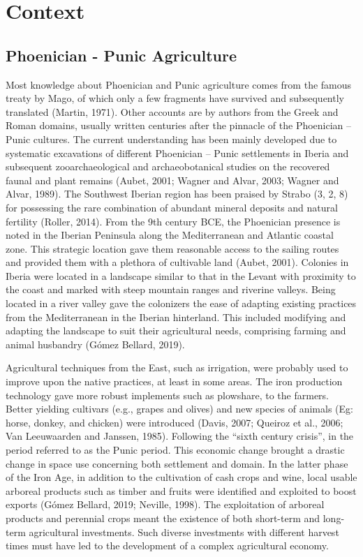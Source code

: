 \documentclass[review]{elsarticle} %
\begin{document}
\hypertarget{context}{%
\section{Context}\label{context}}

\hypertarget{phoenician---punic-agriculture}{%
\subsection{Phoenician - Punic Agriculture}\label{phoenician---punic-agriculture}}

Most knowledge about Phoenician and Punic agriculture comes from the famous treaty by Mago, of which only a few fragments have survived and subsequently translated (Martin, 1971). Other accounts are by authors from the Greek and Roman domains, usually written centuries after the pinnacle of the Phoenician -- Punic cultures. The current understanding has been mainly developed due to systematic excavations of different Phoenician -- Punic settlements in Iberia and subsequent zooarchaeological and archaeobotanical studies on the recovered faunal and plant remains (Aubet, 2001; Wagner and Alvar, 2003; Wagner and Alvar, 1989).
The Southwest Iberian region has been praised by Strabo (3, 2, 8) for possessing the rare combination of abundant mineral deposits and natural fertility (Roller, 2014). From the 9th century BCE, the Phoenician presence is noted in the Iberian Peninsula along the Mediterranean and Atlantic coastal zone. This strategic location gave them reasonable access to the sailing routes and provided them with a plethora of cultivable land (Aubet, 2001). Colonies in Iberia were located in a landscape similar to that in the Levant with proximity to the coast and marked with steep mountain ranges and riverine valleys. Being located in a river valley gave the colonizers the ease of adapting existing practices from the Mediterranean in the Iberian hinterland. This included modifying and adapting the landscape to suit their agricultural needs, comprising farming and animal husbandry (Gómez Bellard, 2019).

Agricultural techniques from the East, such as irrigation, were probably used to improve upon the native practices, at least in some areas. The iron production technology gave more robust implements such as plowshare, to the farmers. Better yielding cultivars (e.g., grapes and olives) and new species of animals (Eg: horse, donkey, and chicken) were introduced (Davis, 2007; Queiroz et al., 2006; Van Leeuwaarden and Janssen, 1985). Following the ``sixth century crisis'', in the period referred to as the Punic period. This economic change brought a drastic change in space use concerning both settlement and domain. In the latter phase of the Iron Age, in addition to the cultivation of cash crops and wine, local usable arboreal products such as timber and fruits were identified and exploited to boost exports (Gómez Bellard, 2019; Neville, 1998). The exploitation of arboreal products and perennial crops meant the existence of both short-term and long-term agricultural investments. Such diverse investments with different harvest times must have led to the development of a complex agricultural economy.
\end{document}
